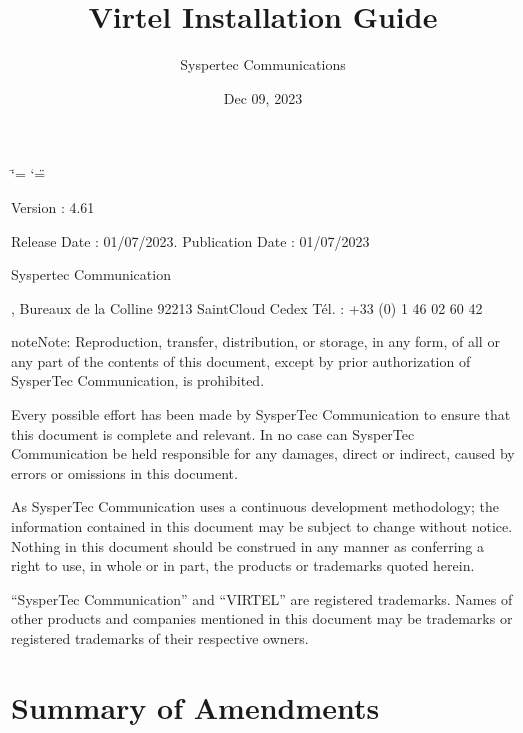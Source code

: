 \documentclass[letterpaper,10pt,english]{sphinxmanual}
\title{Virtel Installation Guide}
\date{Dec 09, 2023}
\author{Syspertec Communications}
\begin{document}
\ifdefined\shorthandoff
  \ifnum\catcode`\=\string=\active\shorthandoff{=}\fi
  \ifnum\catcode`\"=\active{}\fi
\fi

\pagestyle{empty}
\sphinxmaketitle
\pagestyle{plain}
\sphinxtableofcontents
\pagestyle{normal}
\label{\detokenize{Installation_Guide::doc}}


\sphinxAtStartPar
{}

\sphinxAtStartPar
{}

\sphinxAtStartPar
Version : 4.61

\sphinxAtStartPar
Release Date : 01/07/2023. Publication Date : 01/07/2023

\sphinxAtStartPar
Syspertec Communication

, Bureaux de la Colline 92213 Saint\sphinxhyphen{}Cloud Cedex Tél. : +33 (0) 1 46 02 60 42

\sphinxAtStartPar
{}

\begin{sphinxadmonition}{note}{Note:}
\sphinxAtStartPar
Reproduction, transfer, distribution, or storage, in any form, of all or any part of
the contents of this document, except by prior authorization of SysperTec
Communication, is prohibited.

\sphinxAtStartPar
Every possible effort has been made by SysperTec Communication to ensure that this document
is complete and relevant. In no case can SysperTec Communication be held responsible for
any damages, direct or indirect, caused by errors or omissions in this document.

\sphinxAtStartPar
As SysperTec Communication uses a continuous development methodology; the information
contained in this document may be subject to change without notice. Nothing in this
document should be construed in any manner as conferring a right to use, in whole or in
part, the products or trademarks quoted herein.

\sphinxAtStartPar
“SysperTec Communication” and “VIRTEL” are registered trademarks. Names of other products
and companies mentioned in this document may be trademarks or registered trademarks of
their respective owners.
\end{sphinxadmonition}

\newpage


\chapter{Summary of Amendments}
\label{\detokenize{Installation_Guide:summary-of-amendments}}\label{\detokenize{Installation_Guide:virtel461ig-summary-of-ammendments}}
\end{document}
